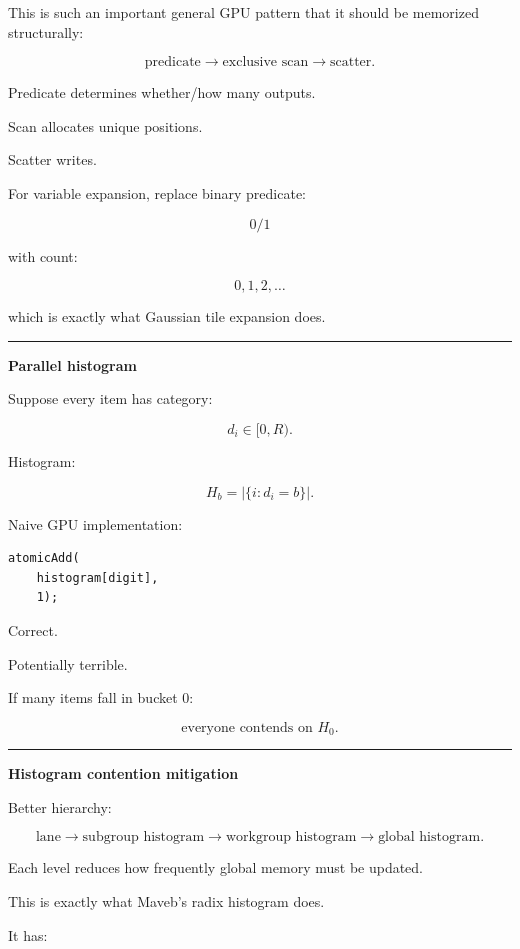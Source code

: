 This is such an important general GPU pattern that it should be memorized structurally:

\[
\boxed{
\text{predicate}
\rightarrow
\text{exclusive scan}
\rightarrow
\text{scatter}.
}
\]

Predicate determines whether/how many outputs.

Scan allocates unique positions.

Scatter writes.

For variable expansion, replace binary predicate:

\[
0/1
\]

with count:

\[
0,1,2,\dots
\]

which is exactly what Gaussian tile expansion does.

\begin{center}\rule{0.5\linewidth}{0.5pt}\end{center}

\textbf{Parallel histogram}

Suppose every item has category:

\[
d_i\in[0,R).
\]

Histogram:

\[
H_b=
|\{i:d_i=b\}|.
\]

Naive GPU implementation:

\protect{}\label{mdso8e}%
\begin{verbatim}
atomicAdd(
    histogram[digit],
    1);
\end{verbatim}

Correct.

Potentially terrible.

If many items fall in bucket 0:

\[
\text{everyone contends on }H_0.
\]

\begin{center}\rule{0.5\linewidth}{0.5pt}\end{center}

\textbf{Histogram contention mitigation}

Better hierarchy:

\[
\text{lane}
\rightarrow
\text{subgroup histogram}
\rightarrow
\text{workgroup histogram}
\rightarrow
\text{global histogram}.
\]

Each level reduces how frequently global memory must be updated.

This is exactly what Maveb's radix histogram does.

It has:

